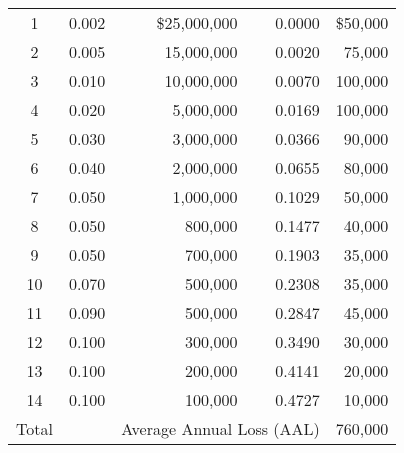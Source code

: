 \documentclass[]{article}
\begin{document}
\begin{itemize}
\begin{table}[h]
\begin{tabular}{crrrr}
    \midrule
    1     & 0.002 &         \$25,000,000  & 0.0000 &            \$50,000  \\
    2     & 0.005 &          15,000,000  & 0.0020 &            75,000  \\
    3     & 0.010 &          10,000,000  & 0.0070 &          100,000  \\
    4     & 0.020 &            5,000,000  & 0.0169 &          100,000  \\
    5     & 0.030 &            3,000,000  & 0.0366 &            90,000  \\
    6     & 0.040 &            2,000,000  & 0.0655 &            80,000  \\
    7     & 0.050 &            1,000,000  & 0.1029 &            50,000  \\
    8     & 0.050 &                800,000  & 0.1477 &            40,000  \\
    9     & 0.050 &                700,000  & 0.1903 &            35,000  \\
    10    & 0.070 &                500,000  & 0.2308 &            35,000  \\
    11    & 0.090 &                500,000  & 0.2847 &            45,000  \\
    12    & 0.100 &                300,000  & 0.3490 &            30,000  \\
    13    & 0.100 &                200,000  & 0.4141 &            20,000  \\
    14    & 0.100 &                100,000  & 0.4727 &            10,000  \\
     \midrule
    Total &  & \multicolumn{2}{r}{Average Annual Loss (AAL)} &          760,000  \\
    \bottomrule
    \end{tabular}%
  \label{tab:addlabel}%
\end{table}%


\end{itemize}
\end{document}

